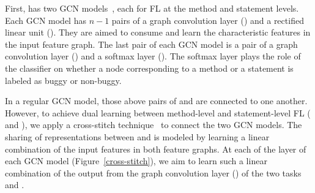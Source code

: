  First, {\tool}
has two GCN models~\cite{kipf2016semi}, each for FL at the method and
statement levels. Each GCN model has $n-1$ pairs of a graph
convolution layer () and a rectified linear unit
(). They are aimed to consume and learn the characteristic
features in the input feature graph. The last pair of each GCN model
is a pair of a graph convolution layer () and a softmax
layer (). The softmax layer plays the role of the
classifier on whether a node corresponding to a method or a statement
is labeled as buggy or non-buggy.

In a regular GCN model, those above pairs of  and
 are connected to one another. However, to achieve dual
learning between method-level and statement-level FL (
and ), we apply a cross-stitch
technique~\cite{misra2016cross} to connect the two GCN models. The
sharing of representations between  and  is
modeled by learning a linear combination of the input features in both
feature graphs. At each of the  layer of each GCN model
(Figure~\ref{cross-stitch}), we aim to learn such a linear combination
of the output from the graph convolution layer () of the
two tasks  and .





